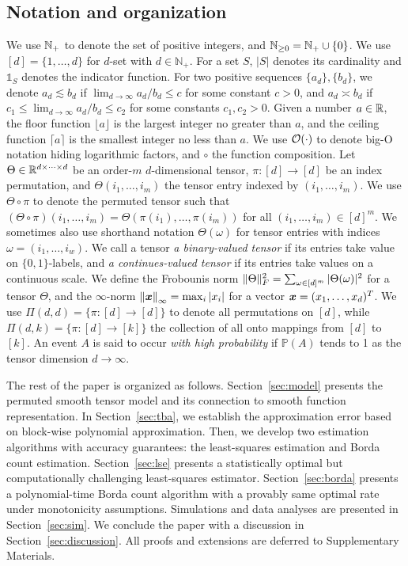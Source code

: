 \documentclass[12pt]{article}
\theoremstyle{definition}
\begin{document}
\subsection{Notation and organization}
We use $\mathbb{N}_{+}$ to denote the set of positive integers, and $\mathbb{N}_{\geq 0}=\mathbb{N}_{+}\cup\{0\}$.
We use $[d]=\{1,\ldots,d\}$ for $d$-set with $d\in\mathbb{N}_{+}$. For a set $S$, $|S|$ denotes its cardinality and $\mathds{1}_S$ denotes the indicator function. For two positive sequences $\{a_d\},\{b_d\}$,  we denote $a_d\lesssim b_d$ if $\lim_{d\to\infty} a_d/b_d\leq c$ for some constant $c>0$, and $a_d\asymp b_d$ if $c_1\leq \lim_{d\to \infty} a_d/b_d\leq c_2$ for some constants $c_1,c_2>0$. Given a number $a\in\mathbb{R}$, the floor function $\lfloor a\rfloor$ is the largest integer no greater than $a$, and the ceiling function $\lceil a\rceil$ is the smallest integer no less than $a$.
We use $\mathcal{O}(\cdot)$ to denote big-O notation hiding logarithmic factors, and $\circ$ the function composition. 
Let $\Theta\in\mathbb{R}^{d\times \cdots \times d}$ be an order-$m$ $d$-dimensional tensor, $\pi\colon[d]\rightarrow[d]$ be an index permutation, and $\Theta(i_1,\ldots,i_m)$ the tensor entry indexed by $(i_1,\ldots,i_m)$. We use $\Theta\circ\pi$ to denote the permuted tensor such that $(\Theta\circ\pi)(i_1,\ldots,i_m) = \Theta(\pi(i_1),\ldots,\pi(i_m))$ for all $(i_1,\ldots,i_m)\in[d]^m$. We sometimes also use shorthand notation $\Theta(\omega)$ for tensor entries with indices $\omega=(i_1,\ldots,i_w)$. We call a tensor \emph{a binary-valued tensor} if its entries take value on $\{0,1\}$-labels, and \emph{a continues-valued tensor} if its entries take values on a continuous scale. We define the Frobounis norm $\lVert\Theta\rVert_F^2=\sum_{\omega\in[d]^m}|\Theta(\omega)|^2$ for a tensor $\Theta$, and the $\infty$-norm $\left\lVert\bm x\right\rVert_\infty=\max_{i}|x_i|$ for a vector $\bm x=(x_1,\ldots,x_d)^T$.
We use $\Pi(d,d)=\{\pi\colon [d]\to[d]\}$ to denote all permutations on $[d]$, while $\Pi(d,k)=\{\pi\colon [d]\to[k]\}$ the collection of all onto mappings from $[d]$ to $[k]$. An event $A$ is said to occur \emph{with high probability} if $\mathbb{P}(A)$ tends to 1 as the tensor dimension $d\to\infty$. 


The rest of the paper is organized as follows. Section~\ref{sec:model} presents the permuted smooth tensor model and its connection to smooth function representation. In Section~\ref{sec:tba}, we establish the approximation error based on block-wise polynomial approximation. Then, we develop two estimation algorithms with accuracy guarantees: the least-squares estimation and Borda count estimation. Section~\ref{sec:lse} presents a statistically optimal but computationally challenging least-squares estimator. Section~\ref{sec:borda} presents a polynomial-time Borda count algorithm with a provably same optimal rate under monotonicity assumptions. Simulations and data analyses are presented in Section~\ref{sec:sim}. We conclude the paper with a discussion in Section~\ref{sec:discussion}. All proofs and extensions are deferred to Supplementary Materials.
\end{document}
